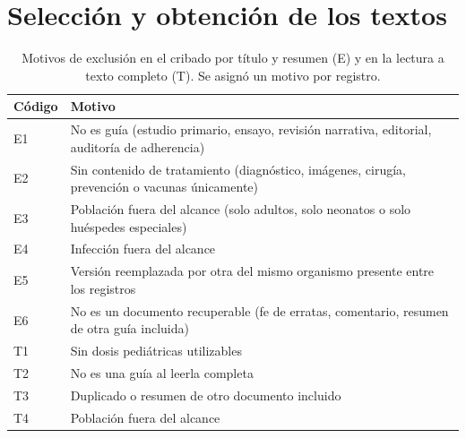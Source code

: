 \documentclass[10pt,a4paper]{article}
\begin{document}
\section{Selección y obtención de los textos}

\begin{table}[htbp]
\centering
\caption{Motivos de exclusión en el cribado por título y resumen (E) y en la lectura a texto completo (T). Se asignó un motivo por registro.}
\small
\begin{tabularx}{\textwidth}{@{}lX@{}}
\toprule
Código & Motivo \\
\midrule
E1 & No es guía (estudio primario, ensayo, revisión narrativa, editorial, auditoría de adherencia) \\
E2 & Sin contenido de tratamiento (diagnóstico, imágenes, cirugía, prevención o vacunas únicamente) \\
E3 & Población fuera del alcance (solo adultos, solo neonatos o solo huéspedes especiales) \\
E4 & Infección fuera del alcance \\
E5 & Versión reemplazada por otra del mismo organismo presente entre los registros \\
E6 & No es un documento recuperable (fe de erratas, comentario, resumen de otra guía incluida) \\
\midrule
T1 & Sin dosis pediátricas utilizables \\
T2 & No es una guía al leerla completa \\
T3 & Duplicado o resumen de otro documento incluido \\
T4 & Población fuera del alcance \\
\bottomrule
\end{tabularx}
\end{table}
\end{document}
